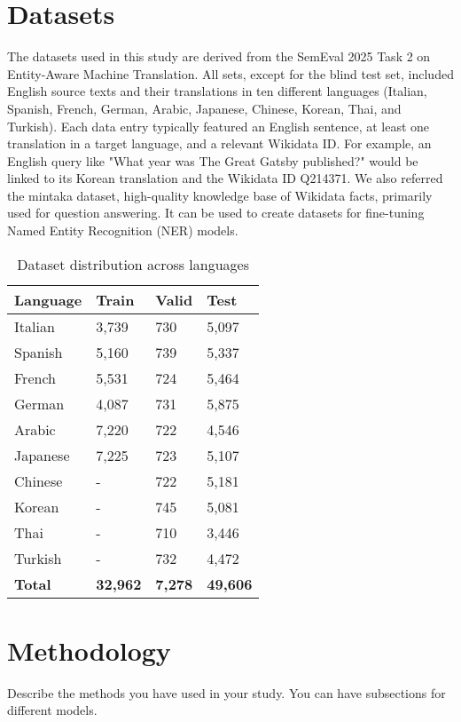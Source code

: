 \documentclass{ecai}
\begin{document}
\section{Datasets}
\label{sec:datasets}
The datasets used in this study are derived from the SemEval 2025 Task 2 on Entity-Aware Machine Translation.
All sets, except for the blind test set, included English source texts and their translations in ten 
different languages (Italian, Spanish, French, German, Arabic, Japanese, Chinese, Korean, Thai, and Turkish). 
Each data entry typically featured an English sentence, at least one translation in a target language, 
and a relevant Wikidata ID. 
For example, an English query like "What year was The Great Gatsby published?" 
would be linked to its Korean translation and the Wikidata ID Q214371. We also referred the mintaka\cite{sen-etal-2022-mintaka} dataset,
high-quality knowledge base of Wikidata facts, primarily used for question answering. It can be used to create
datasets for fine-tuning Named Entity Recognition (NER) models.
\begin{table}[h!]
\centering
\begin{tabular}{ll@{\hspace{8mm}}ll}
\hline
\textbf{Language} & \textbf{Train} & \textbf{Valid} & \textbf{Test} \\
\hline
Italian & 3,739 & 730 & 5,097 \\
Spanish & 5,160 & 739 & 5,337 \\
French & 5,531 & 724 & 5,464 \\
German & 4,087 & 731 & 5,875 \\
Arabic & 7,220 & 722 & 4,546 \\
Japanese & 7,225 & 723 & 5,107 \\
Chinese & - & 722 & 5,181 \\
Korean & - & 745 & 5,081 \\
Thai & - & 710 & 3,446 \\
Turkish & - & 732 & 4,472 \\
\hline
\textbf{Total} & \textbf{32,962} & \textbf{7,278} & \textbf{49,606} \\
\hline
\end{tabular}
\caption{Dataset distribution across languages}
\label{tab:dataset_distribution}
\end{table}

\section{Methodology}
\label{sec:methodology}
Describe the methods you have used in your study. You can have subsections for different models.
\end{document}
